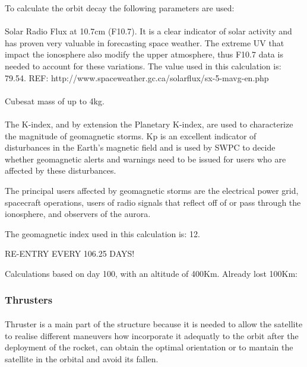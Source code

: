 To calculate the orbit decay the following parameters are used:
\paragraph{}Solar Radio Flux at 10.7cm (F10.7). It is a clear indicator of solar activity and has proven very valuable in forecasting space weather. The extreme UV that impact the ionosphere also modify the upper atmosphere, thus F10.7 data is needed to account for these variations. The value used in this calculation is: 79.54.
REF: http://www.spaceweather.gc.ca/solarflux/sx-5-mavg-en.php

\paragraph{}Cubesat mass of up to 4kg.

\paragraph{}The K-index, and by extension the Planetary K-index, are used to characterize the magnitude of geomagnetic storms. Kp is an excellent indicator of disturbances in the Earth's magnetic field and is used by SWPC to decide whether geomagnetic alerts and warnings need to be issued for users who are affected by these disturbances.

The principal users affected by geomagnetic storms are the electrical power grid, spacecraft operations, users of radio signals that reflect off of or pass through the ionosphere, and observers of the aurora.

The geomagnetic index used in this calculation is: 12.

RE-ENTRY EVERY 106.25 DAYS!

Calculations based on day 100, with an altitude of 400Km. Already lost 100Km:



\subsubsection{Thrusters}

\paragraph{}
Thruster is a main part of the structure because it is needed to allow the satellite to realise different maneuvers how incorporate it adequatly to the orbit after the deployment of the rocket, can obtain the optimal orientation or to mantain the satellite in the orbital and avoid its fallen. 

